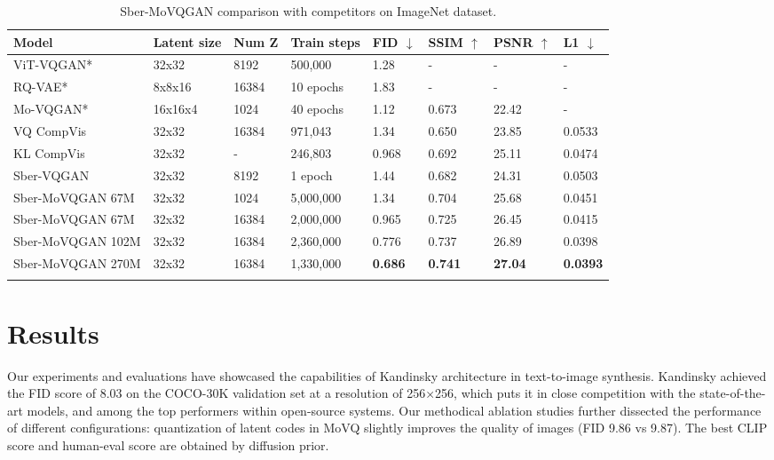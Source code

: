 \documentclass[11pt]{article}
\begin{document}
\begin{table*}[hbt!]
\small
\centering
\caption{Sber-MoVQGAN comparison with competitors on ImageNet dataset.}
\label{tab:model_comparisons}
\begin{tabular}{llllllll}
\hline
\bf Model & \bf  Latent size & \bf  Num Z & \bf  Train steps & \bf  FID $\downarrow$ & \bf  SSIM $\uparrow$ & \bf  PSNR $\uparrow$ & \bf  L1 $\downarrow$ \\
\hline
ViT-VQGAN* & 32x32 & 8192 & 500,000 & 1.28 & - & - & - \\
RQ-VAE* & 8x8x16 & 16384 &  10 epochs & 1.83 & - & - & - \\
Mo-VQGAN* & 16x16x4 & 1024 &  40 epochs & 1.12 & 0.673 & 22.42 & - \\
VQ CompVis & 32x32 & 16384 & 971,043 & 1.34 & 0.650 & 23.85 & 0.0533 \\
KL CompVis & 32x32 & - & 246,803 & 0.968 & 0.692 & 25.11 & 0.0474 \\
Sber-VQGAN & 32x32 & 8192 & 1 epoch & 1.44 & 0.682 & 24.31 & 0.0503 \\
Sber-MoVQGAN 67M & 32x32 & 1024 & 5,000,000 & 1.34 & 0.704 & 25.68 & 0.0451 \\
Sber-MoVQGAN 67M & 32x32 & 16384 & 2,000,000 & 0.965 & 0.725 & 26.45 & 0.0415 \\
Sber-MoVQGAN 102M & 32x32 & 16384 & 2,360,000 & 0.776 & 0.737 & 26.89 & 0.0398 \\
Sber-MoVQGAN 270M & 32x32 & 16384 & 1,330,000 & \textbf{0.686} & \textbf{0.741} & \textbf{27.04} & \textbf{0.0393}\\\hline
\label{movq}
\end{tabular}
\end{table*}


\section{Results}

Our experiments and evaluations have showcased the capabilities of Kandinsky architecture in text-to-image synthesis. Kandinsky achieved the FID score of 8.03 on the COCO-30K validation set at a resolution of 256×256, which puts it in close competition with the state-of-the-art models, and among the top performers within open-source systems. Our methodical ablation studies further dissected the performance of different configurations: quantization of latent codes in MoVQ slightly improves the quality of images (FID 9.86 vs 9.87). The best CLIP score and human-eval score are obtained by diffusion prior. 
\end{document}

